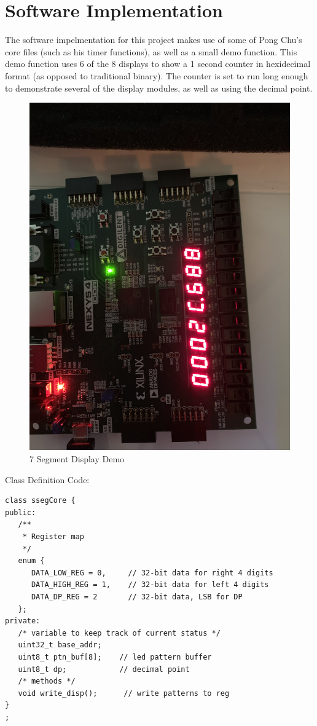 \documentclass{article}
\begin{document}
\newpage

\section{Software Implementation}
The software impelmentation for this project makes use of some of Pong Chu's core files (such as his timer functions), as well as a small demo function. This demo function uses 6 of the 8 displays to show a 1 second counter in hexidecimal format (as opposed to traditional binary). The counter is set to run long enough to demonstrate several of the display modules, as well as using the decimal point. 

	\begin{figure}[h!]
		\includegraphics[width=.9\linewidth]{d1.JPG}
		\caption{7 Segment Display Demo}
	\end{figure}
Class Definition Code:
\begin{lstlisting}[language=C=++]
class ssegCore {
public:
   /**
    * Register map
    */
   enum {
      DATA_LOW_REG = 0, 	// 32-bit data for right 4 digits
      DATA_HIGH_REG = 1, 	// 32-bit data for left 4 digits
	  DATA_DP_REG = 2		// 32-bit data, LSB for DP
   };
private:
   /* variable to keep track of current status */
   uint32_t base_addr;
   uint8_t ptn_buf[8];    // led pattern buffer
   uint8_t dp;            // decimal point
   /* methods */
   void write_disp();      // write patterns to reg
}
;
\end{lstlisting}
\end{document}
